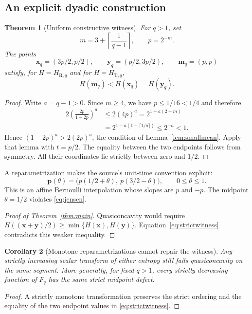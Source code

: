 \documentclass[11pt]{article}
\numberwithin{equation}{section}
\newtheorem{theorem}{Theorem}[section]
\newtheorem{corollary}[theorem]{Corollary}
\theoremstyle{definition}
\theoremstyle{remark}
\begin{document}
\subsection{An explicit dyadic construction}
\begin{theorem}[Uniform constructive witness]\label{thm:dyadic}
For $q>1$, set
\begin{equation}
 m=3+\left\lceil\frac1{q-1}\right\rceil,\qquad p=2^{-m}.
 \label{eq:dyadic}
\end{equation}
The points
\begin{equation}
 \boldsymbol x_q=(3p/2,p/2),\qquad
 \boldsymbol y_q=(p/2,3p/2),\qquad
 \boldsymbol m_q=(p,p)
\end{equation}
satisfy, for $H=H_{\mathrm R,q}$ and for $H=H_{\mathrm T,q}$,
\begin{equation}
 H(\boldsymbol m_q)<H(\boldsymbol x_q)=H(\boldsymbol y_q).
 \label{eq:strictwitness}
\end{equation}
\end{theorem}
\begin{proof}
Write $a=q-1>0$. Since $m\geq4$, we have $p\leq1/16<1/4$ and therefore
\begin{align}
 2\left(\frac{2p}{1-2p}\right)^a
 &\leq 2(4p)^a
 =2^{1+a(2-m)}\\
 &=2^{1-a(1+\lceil1/a\rceil)}
 \leq2^{-a}<1.
\end{align}
Hence $(1-2p)^a>2(2p)^a$, the condition of
Lemma~\ref{lem:smallmean}. Apply that lemma with $t=p/2$. The equality between
the two endpoints follows from symmetry. All their coordinates lie strictly
between zero and $1/2$.
\end{proof}

A reparametrization makes the source's unit-time convention explicit:
\[
 \boldsymbol p(\theta)
 =\bigl(p(1/2+\theta),\ p(3/2-\theta)\bigr),
 \qquad 0\leq\theta\leq1.
\]
This is an affine Bernoulli interpolation whose slopes are $p$ and $-p$.
The midpoint $\theta=1/2$ violates \eqref{eq:jensen}.

\begin{proof}[Proof of Theorem~\ref{thm:main}]
Quasiconcavity would require
$H((\boldsymbol x+\boldsymbol y)/2)\geq
\min\{H(\boldsymbol x),H(\boldsymbol y)\}$.
Equation~\eqref{eq:strictwitness} contradicts this weaker inequality.
\end{proof}

\begin{corollary}[Monotone reparametrizations cannot repair the witness]
Any strictly increasing scalar transform of either entropy still fails
quasiconcavity on the same segment. More generally, for fixed $q>1$, every
strictly decreasing function of $F_q$ has the same strict midpoint defect.
\end{corollary}
\begin{proof}
A strictly monotone transformation preserves the strict ordering and the
equality of the two endpoint values in \eqref{eq:strictwitness}.
\end{proof}
\end{document}
